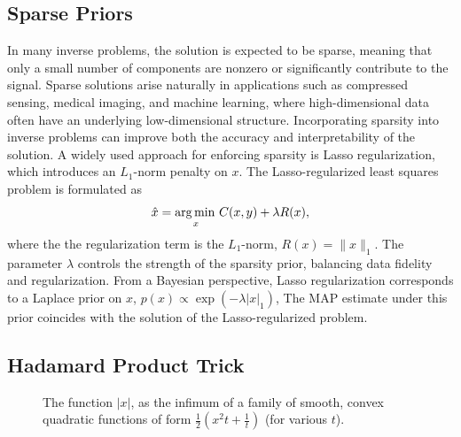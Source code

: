 \documentclass{article}
\begin{document}
\subsection{Sparse Priors}
In many inverse problems, the solution is expected to be sparse, meaning that only a small number of components are nonzero or significantly contribute to the signal. Sparse solutions arise naturally in applications such as compressed sensing, medical imaging, and machine learning, where high-dimensional data often have an underlying low-dimensional structure. Incorporating sparsity into inverse problems can improve both the accuracy and interpretability of the solution. A widely used approach for enforcing sparsity is Lasso regularization, which introduces an $L_1$-norm penalty on $x$. The Lasso-regularized least squares problem is formulated as
\begin{equation} \label{xlasso}
\hat{x} = \operatorname*{arg\, min \,}_{x} C(x,y) + \lambda R(x),
\end{equation}
where the the regularization term is the $L_1$-norm, $R(x) = \|x\|_1$. The parameter $\lambda$ controls the strength of the sparsity prior, balancing data fidelity and regularization. From a Bayesian perspective, Lasso regularization corresponds to a Laplace prior on $x$, $p(x) \propto \exp(-\lambda |x|_1)$,
The MAP estimate under this prior coincides with the solution of the Lasso-regularized problem.

\subsection{Hadamard Product Trick}
\begin{figure}[h!]
    \centering
    \caption{The function $|x|$, as the infimum of a family of smooth, convex quadratic functions of form $\frac{1}{2}\left(x^2t + \frac{1}{t} \right)$ (for various $t$).}
    \label{fig:my_label}
\end{figure}
\end{document}
